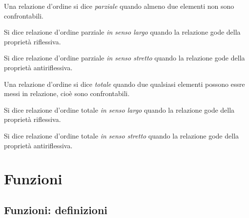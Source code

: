 \begin{definizione}
Una relazione d'ordine si dice \emph{parziale} quando almeno due elementi non 
sono confrontabili.
\end{definizione}

\begin{definizione}
Si dice relazione d'ordine parziale \emph{in senso largo} quando la relazione 
gode della proprietà riflessiva.
\end{definizione}

\begin{definizione}
Si dice relazione d'ordine parziale \emph{in senso stretto} quando la relazione 
gode della proprietà antiriflessiva.
\end{definizione}

\begin{definizione}
Una relazione d'ordine si dice \emph{totale} quando due qualsiasi elementi 
possono essre messi in relazione, cioè sono confrontabili.
\end{definizione}

\begin{definizione}
Si dice relazione d'ordine totale \emph{in senso largo} quando la relazione gode 
della proprietà riflessiva.
\end{definizione}

\begin{definizione}
Si dice relazione d'ordine totale \emph{in senso stretto} quando la relazione 
gode della proprietà antiriflessiva.
\end{definizione}

\begin{center}
 
\end{center}






\section{Funzioni}
\label{sec:funzioni}

\subsection{Funzioni: definizioni}
\label{subsec:fun_definizioni}

